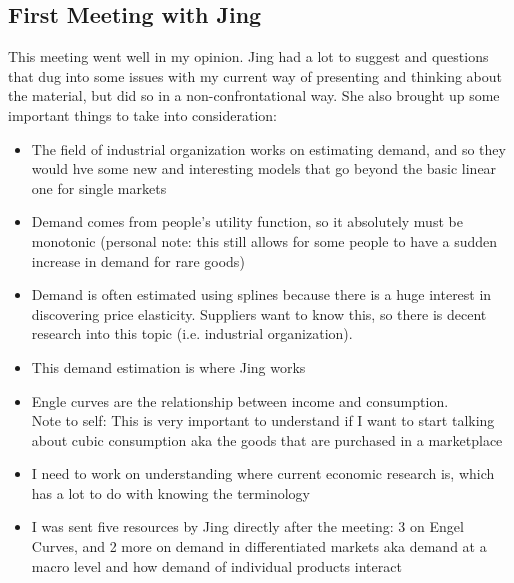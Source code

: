 \documentclass{article}
\begin{document}
\subsection{First Meeting with Jing}
This meeting went well in my opinion. Jing had a lot to suggest and questions that dug into some issues with my current way of presenting and thinking about the material, but did so in a non-confrontational way. She also brought up some important things to take into consideration:
\begin{itemize}
	\item The field of industrial organization works on estimating demand, and so they would hve some new and interesting models that go beyond the basic linear one for single markets
	\item Demand comes from people's utility function, so it absolutely must be monotonic (personal note: this still allows for some people to have a sudden increase in demand for rare goods)
	\item Demand is often estimated using splines because there is a huge interest in discovering price elasticity. Suppliers want to know this, so there is decent research into this topic (i.e. industrial organization). 
	\item This demand estimation is where Jing works
	\item Engle curves are the relationship between income and consumption.\\
	Note to self: This is very important to understand if I want to start talking about cubic consumption aka the goods that are purchased in a marketplace
	\item I need to work on understanding where current economic research is, which has a lot to do with knowing the terminology
	\item I was sent five resources by Jing directly after the meeting: 3 on Engel Curves, and 2 more on demand in differentiated markets aka demand at a macro level and how demand of individual products interact
\end{itemize}



\end{document}

